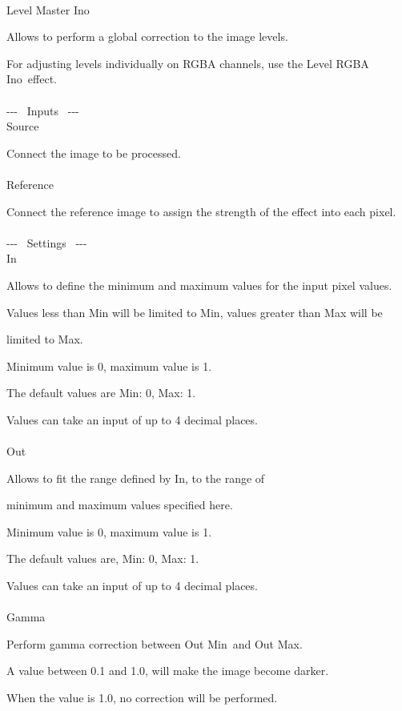 \documentclass[a4paper,12pt]{article}
\begin{document}
\thispagestyle{empty}

\Large
\noindent \\
Level Master Ino\medskip
\par
\normalsize
Allows to perform a global correction to the image levels.\par
For adjusting levels individually on RGBA channels, use the \textquotedbl Level RGBA Ino\textquotedbl \ effect.\\
\\
-{-}- \ Inputs \ -{-}-\\
Source\par
Connect the image to be processed.\\
\\
Reference\par
Connect the reference image to assign the strength of the effect into each pixel.\\
\\
-{-}- \ Settings \ -{-}-\\
In\par
Allows to define the minimum and maximum values for the input pixel values.\par
Values less than Min will be limited to Min, values greater than Max will be\par 
limited to Max.\par
Minimum value is 0, maximum value is 1.\par
The default values are Min: 0, Max: 1.\par
Values can take an input of up to 4 decimal places.\\
\\
Out\par
Allows to fit the range defined by \textquotedbl In\textquotedbl , to the range of\par 
minimum and maximum values specified here.\par
Minimum value is 0, maximum value is 1.\par
The default values are, Min: 0, Max: 1.\par
Values can take an input of up to 4 decimal places.\\
\\
Gamma\par
Perform gamma correction between \textquotedbl Out Min\textquotedbl \ and \textquotedbl Out Max\textquotedbl .\par
A value between 0.1 and 1.0, will make the image become darker.\par
When the value is 1.0, no correction will be performed.\par
\end{document}
